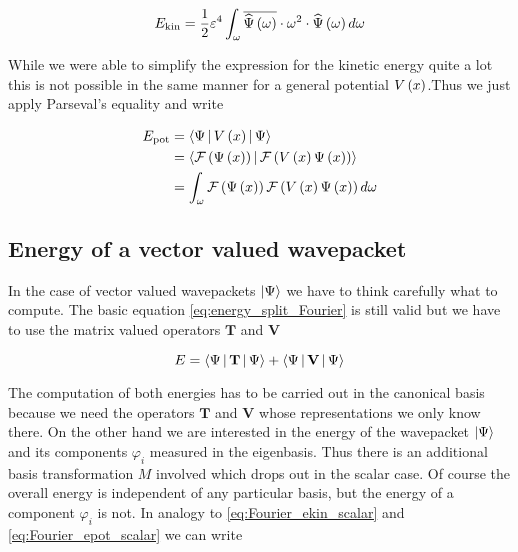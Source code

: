 \begin{equation} \label{eq:Fourier_ekin_scalar}
  E_{\text{kin}} = \frac{1}{2} \varepsilon^4 \int_\omega \overline{\widehat{\Psi}\left( \omega \right)} \cdot \omega^2 \cdot \widehat{\Psi}\left( \omega \right) d\omega
\end{equation}

While we were able to simplify the expression for the kinetic energy quite a lot
this is not possible in the same manner for a general potential $V\left( x \right)$.Thus
we just apply Parseval's equality and write

\begin{align} \label{eq:Fourier_epot_scalar}
  E_{\text{pot}} & = \Braket{\Psi | V\left( x \right) | \Psi} \nonumber \\
                 & = \Braket{\mathcal{F}\left(\Psi\left( x \right)\right) | \mathcal{F}\left(V\left( x \right) \Psi\left( x \right)\right)} \nonumber \\
                 & = \int_\omega \mathcal{F}\left(\Psi\left( x \right)\right) \mathcal{F}\left(V\left( x \right) \Psi\left( x \right)\right) d\omega
\end{align}


\subsection{Energy of a vector valued wavepacket}

In the case of vector valued wavepackets $\Ket{\Psi}$
we have to think carefully what to compute. The basic equation \eqref{eq:energy_split_Fourier}
is still valid but we have to use the matrix valued operators $\mathbf{T}$ and $\mathbf{V}$

\begin{equation}
  E =  \Braket{\Psi | \mathbf{T} | \Psi } + \Braket{\Psi | \mathbf{V} | \Psi }
\end{equation}

The computation of both energies has to be carried out in the canonical basis because
we need the operators $\mathbf{T}$ and $\mathbf{V}$ whose representations we only
know there. On the other hand we are interested in the energy of the wavepacket $\Ket{\Psi}$
and its components $\varphi_i$ measured in the eigenbasis. Thus there is an additional
basis transformation $M$ involved which drops out in the scalar case.
Of course the overall energy is independent of any particular basis, but the energy
of a component $\varphi_i$ is not. In analogy to \eqref{eq:Fourier_ekin_scalar} and
\eqref{eq:Fourier_epot_scalar} we can write

